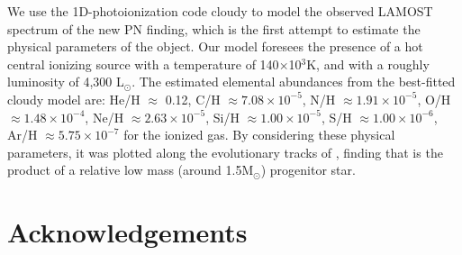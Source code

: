 \documentclass[fleqn,usenatbib]{mnras}
\begin{document}
We use the 1D-photoionization code {\sc cloudy} to model
the observed LAMOST spectrum of the new PN finding, which is
the first attempt to estimate the physical parameters of the object.
Our model foresees the presence of a hot central ionizing source
with a temperature of 140$\times$10$^{3}$K, and with a
roughly luminosity of 4,300 L$_{\odot}$. The estimated elemental abundances
from the best-fitted {\sc cloudy} model are:
He/H $\approx$ 0.12, C/H $\approx 7.08\times10^{-5}$, N/H $\approx 1.91\times10^{-5}$,
O/H $\approx 1.48 \times10^{-4}$, Ne/H $\approx 2.63\times10^{-5}$,
Si/H $\approx 1.00 \times10^{-5}$, S/H $\approx 1.00\times10^{-6}$,
Ar/H $\approx 5.75 \times10^{-7}$ for the ionized gas. By considering these
physical parameters, it was plotted along the evolutionary tracks of
\citet{Miller:2016}, finding that is the product of a relative low mass
(around 1.5M$_{\odot}$) progenitor star. 



\section*{Acknowledgements}
\end{document}
